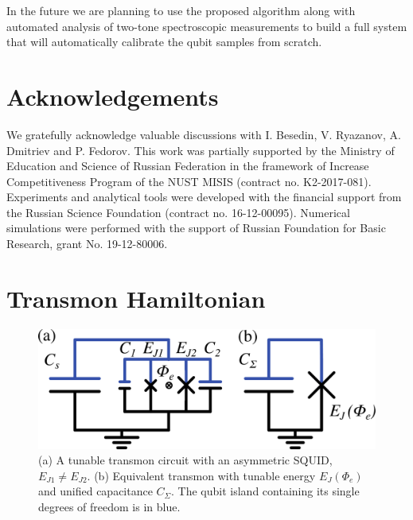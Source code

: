\documentclass[%
 aip,
 amsmath,amssymb,
 reprint,%
]{revtex4-1}
\begin{document}
In the future we are planning to use the proposed algorithm along with automated analysis of two-tone spectroscopic measurements to build a full system that will automatically calibrate the qubit samples from scratch.

\section{Acknowledgements}

We gratefully acknowledge valuable discussions with I. Besedin, V. Ryazanov, A. Dmitriev and P. Fedorov. 
This work was partially supported by the Ministry of Education and Science of Russian Federation in the framework of Increase Competitiveness Program of the NUST MISIS (contract no. K2-2017-081). Experiments and analytical tools were developed with the financial support from the Russian Science Foundation (contract no. 16-12-00095). Numerical simulations were performed with the support of Russian Foundation for Basic Research, grant No. 19-12-80006.

\appendix

\section{Transmon Hamiltonian}\label{sec:transmon}

\begin{figure}[b]
	\centering
	\includegraphics[width=\linewidth]{transmon}
	\caption{(a) A tunable transmon circuit with an asymmetric SQUID, $E_{J1} \neq E_{J2}$. (b) Equivalent transmon with tunable energy $E_{J}(\Phi_e)$ and unified capacitance $C_{\Sigma}$. The qubit island containing its single degrees of freedom is in blue.}
	\label{fig:trans}
\end{figure}
\end{document}
